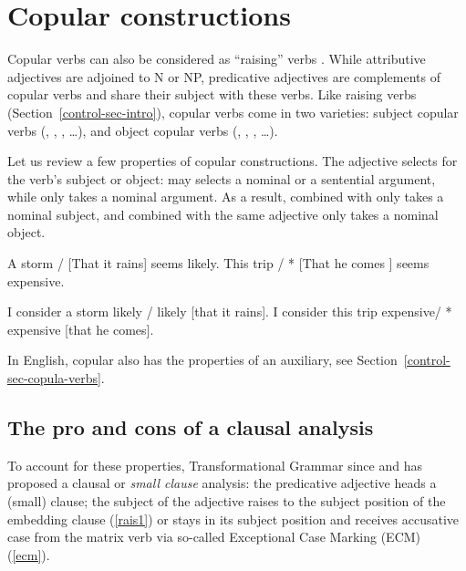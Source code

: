 \documentclass[output=paper
                ,modfonts
                ,nonflat
	        ,collection
	        ,collectionchapter
	        ,collectiontoclongg
 	        ,biblatex
                ,babelshorthands
                ,newtxmath
                ,draftmode
                ,colorlinks, citecolor=brown
]{./langsci/langscibook}
\begin{document}
\section{Copular constructions}
\label{sec-copular-constructions}

Copular verbs can also be considered as ``raising'' verbs \citep{Chomsky1981}. 
While attributive adjectives are adjoined to N or NP, predicative adjectives are complements of copular verbs and share their subject with these verbs. Like raising verbs (Section~\ref{control-sec-intro}), copular verbs come in two varieties: subject copular verbs (, , , \ldots), and object copular verbs (, , , \ldots).

Let us review a few properties of copular constructions.
The adjective selects for the verb's subject or object:  may selects a nominal or a sentential argument, while  only takes a nominal argument. As a result,  combined with  only takes a nominal subject, and  combined with the same adjective only takes a nominal object.


\begin{exe}
\ex \label{storm}
\begin{xlist}
\ex A storm / [That it rains] seems likely.
\ex This trip / * [That he comes ] seems expensive.
\end{xlist}
\ex \begin{xlist}
\ex 	I consider a storm likely / likely [that it rains].
\ex 	I consider this trip expensive/ * expensive [that he comes].
\end{xlist}	
\end{exe}

In English, copular  also has the properties of an auxiliary, see Section~\ref{control-sec-copula-verbs}.

\subsection{The pro and cons of a clausal analysis}

To account for these properties, Transformational Grammar since \citet{Stowell1983} and
\citet{Chomsky1986} has proposed a clausal or \emph{small clause} analysis: the predicative
adjective heads a (small) clause; the subject of the adjective raises to the subject position of the
embedding clause (\ref{rais1}) or stays in its subject position and receives accusative case from
the matrix verb via so-called Exceptional Case Marking (ECM) (\ref{ecm}).
\end{document}
